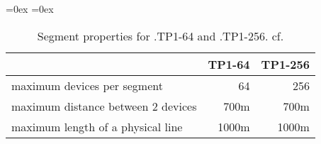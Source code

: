 \begin{table}
	\aboverulesep=0ex
	\belowrulesep=0ex
	\renewcommand{\arraystretch}{1.2}
	
	\centering
	\begin{tabular}{|l|r|r|}
		\toprule
		& \textbf{TP1-64} & \textbf{TP1-256} \\\midrule
		maximum devices per segment & 64 & 256 \\
		maximum distance between 2 devices & 700m & 700m \\
		maximum length of a physical line & 1000m & 1000m \\
		\bottomrule
	\end{tabular}
	\caption[Segment properties for \knx.TP1-64 and \knx.TP1-256]{Segment properties for \knx.TP1-64 and \knx.TP1-256. cf. \textcite{Sokollik2017}}
	\label{tab:background:bas:knx:topo:tpsegments}
\end{table}